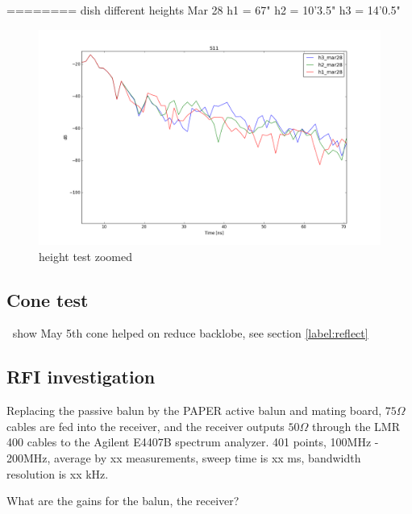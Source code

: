 \documentclass[preprint]{aastex}  %
\begin{document}
========
dish different heights
Mar 28
h1 = 67"
h2 = 10'3.5"
h3 = 14'0.5"

\begin{figure}[H]
	\begin{center}
	\includegraphics[width =\textwidth]{reflectometry_plots/Mar28/height_test_zoom}
	\caption{height test zoomed
\label{Fig:} }
	\end{center}
\end{figure}



\subsection{Cone test}
$\>$ show May 5th cone helped on reduce backlobe, see section \ref{label:reflect}

\subsection{RFI investigation}
Replacing the passive balun by the PAPER active balun and mating board, $75 \Omega$ cables are fed into the receiver, and the receiver outputs $50\Omega$ through the LMR 400 cables to the Agilent E4407B spectrum analyzer. 401 points, 100MHz - 200MHz, average by xx measurements, sweep time is xx ms, bandwidth resolution is xx kHz.

What are the gains for the balun, the receiver?
\end{document}

